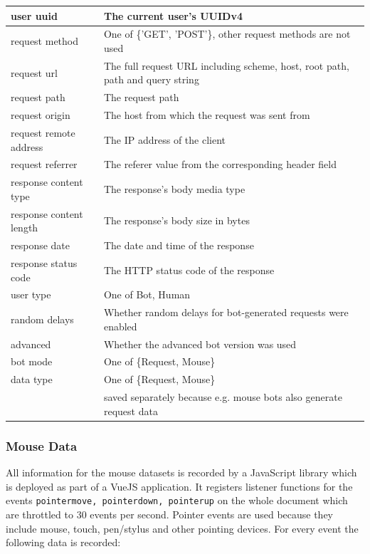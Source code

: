 \documentclass[
    fontsize=12pt,
    headings=small,
    parskip=half,           %
    bibliography=totoc,
    numbers=noenddot,       %
    open=any,               %
    final                   %
]{scrreprt}
\begin{document}
\begin{table}[]
\begin{tabular}{|l|l|}
\hline
user uuid & The current user's UUIDv4 \\ \hline
request method & One of \{'GET', 'POST'\}, other request methods are not used \\ \hline
request url & The full request URL including scheme, host, root path, path and query string \\ \hline
request path & The request path \\ \hline
request origin & The host from which the request was sent from \\ \hline
request remote address & The IP address of the client \\ \hline
request referrer & The referer value from the corresponding header field \\ \hline
response content type & The response's body media type \\ \hline
response content length & The response's body size in bytes \\ \hline
response date & The date and time of the response \\ \hline
response status code & The HTTP status code of the response \\ \hline
user type & One of {Bot, Human} \\ \hline
random delays & Whether random delays for bot-generated requests were enabled \\ \hline
advanced & Whether the advanced bot version was used \\ \hline
bot mode & One of \{Request, Mouse\} \\ \hline
data type & One of \{Request, Mouse\} \\ & saved separately because e.g. mouse bots also generate request data \\ \hline

\end{tabular}
\end{table}

\subsubsection{Mouse Data}

All information for the mouse datasets is recorded by a JavaScript library which is deployed as part of a VueJS application. It registers listener functions for the events \lstinline{pointermove, pointerdown, pointerup} on the whole document which are throttled to $30$ events per second. Pointer events are used because they include mouse, touch, pen/stylus and other pointing devices. For every event the following data is recorded:
\end{document}
